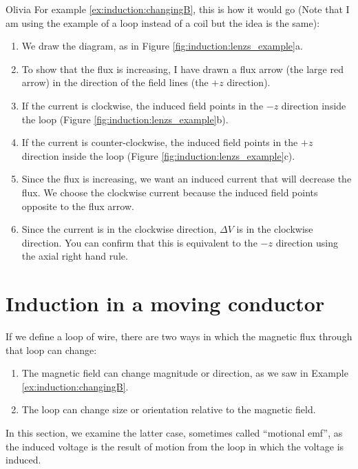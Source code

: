 \begin{studentOpinion}{Olivia}
For example \ref{ex:induction:changingB}, this is how it would go (Note that I am using the example of a loop instead of a coil but the idea is the same):
\begin{enumerate}
\item We draw the diagram, as in Figure \ref{fig:induction:lenzs_example}a.  
\item To show that the flux is increasing, I have drawn a flux arrow (the large red arrow) in the direction of the field lines (the $+z$ direction).
\item If the current is clockwise, the induced field points in the $-z$ direction inside the loop (Figure \ref{fig:induction:lenzs_example}b).
\item If the current is counter-clockwise, the induced field points in the $+z$ direction inside the loop (Figure \ref{fig:induction:lenzs_example}c).
\item Since the flux is increasing, we want an induced current that will decrease the flux. We choose the clockwise current because the induced field points opposite to the flux arrow.
\item Since the current is in the clockwise direction, $\Delta V$ is in the clockwise direction. You can confirm that this is equivalent to the $-z$ direction using the axial right hand rule. 
\end{enumerate}
\end{studentOpinion}


\section{Induction in a moving conductor}
If we define a loop of wire, there are two ways in which the magnetic flux through that loop can change:
\begin{enumerate}
\item The magnetic field can change magnitude or direction, as we saw in Example \ref{ex:induction:changingB}.
\item The loop can change size or orientation relative to the magnetic field.
\end{enumerate}
In this section, we examine the latter case, sometimes called ``motional emf'', as the induced voltage is the result of motion from the loop in which the voltage is induced. 

